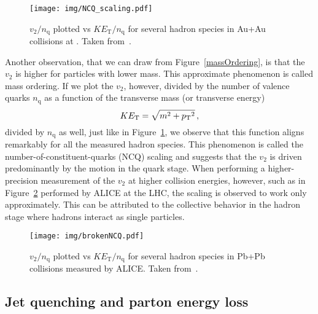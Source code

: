 \begin{figure}[!htb]
\centering
\texttt{[image: img/NCQ\_scaling.pdf]}
\caption[$v_2/n_\mathrm{q}$ plotted vs $K E_\mathrm{T}/n_\mathrm{q}$ for several hadron species in Au+Au collisions.]{\label{NCQscaling}$v_2/n_\mathrm{q}$ plotted vs $K E_\mathrm{T}/n_\mathrm{q}$ for several hadron species in Au+Au collisions at \snnFull\@. Taken from~\cite{NCQscalingPhenix}.}

\end{figure}

Another observation, that we can draw from Figure~\ref{massOrdering}, is that the $v_2$ is higher for particles with lower mass. This approximate phenomenon is called mass ordering. 
If we plot the $v_2$, however, divided by the number of valence quarks $n_\mathrm{q}$ as a function of the transverse mass (or transverse energy)
\begin{equation}
 K E_\mathrm{T}  = \sqrt{m^2 + {p_{\mathrm{T}}}^2}\,,
\end{equation}
divided by $n_\mathrm{q}$ as well, just like in Figure~\ref{NCQscaling}, we observe that this function aligns remarkably for all the measured hadron species. This phenomenon is called the number-of-constituent-quarks (NCQ) scaling and suggests that the $v_2$ is driven predominantly by the motion in the quark stage. When performing a higher-precision measurement of the $v_2$ at higher collision energies, however, such as in Figure~\ref{brokenNCQ} performed by ALICE at the LHC, the scaling is observed to work only approximately. This can be attributed to the collective behavior in the hadron stage where hadrons interact as single particles.

\begin{figure}[!htb]
\centering
\texttt{[image: img/brokenNCQ.pdf]}
\caption[$v_2/n_\mathrm{q}$ plotted vs $K E_\mathrm{T}/n_\mathrm{q}$ for several hadron species in Pb+Pb collisions measured by ALICE.]{\label{brokenNCQ}$v_2/n_\mathrm{q}$ plotted vs $K E_\mathrm{T}/n_\mathrm{q}$ for several hadron species in Pb+Pb collisions measured by ALICE\@. Taken from~\cite{ALICEncq}.}

\end{figure}


\subsection{Jet quenching and parton energy loss}

